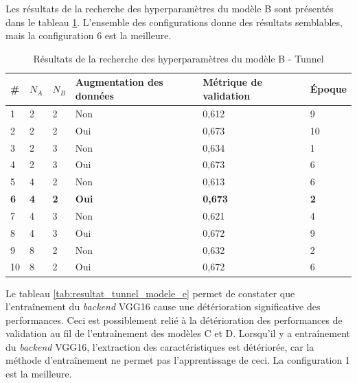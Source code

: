     Les résultats de la recherche des hyperparamètres du modèle B sont présentés dans le tableau \ref{tab:resultat_tunnel_modele_b}. L'ensemble des configurations donne des résultats semblables, mais la configuration 6 est la meilleure.
    \bigskip

    \begin{table}
        \centering
        \caption{Résultats de la recherche des hyperparamètres du modèle B - Tunnel}
        \label{tab:resultat_tunnel_modele_b}
        \begin{tabular}{lllp{3cm}p{3cm}l}
            \midrule
            \# & \(N_A\) & \(N_B\) & Augmentation des données & Métrique de validation & Époque\\
            \midrule\midrule
            1  & 2 & 2 & Non & 0,612 & 9\\
            2  & 2 & 2 & Oui & 0,673 & 10\\
            3  & 2 & 3 & Non & 0,634 & 1\\
            4  & 2 & 3 & Oui & 0,673 & 6\\
            5  & 4 & 2 & Non & 0,613 & 6\\
            \textbf{6}  & \textbf{4} & \textbf{2} & \textbf{Oui} & \textbf{0,673} & \textbf{2}\\
            7  & 4 & 3 & Non & 0,621 & 4\\
            8  & 4 & 3 & Oui & 0,672 & 9\\
            9  & 8 & 2 & Non & 0,632 & 2\\
            10 & 8 & 2 & Oui & 0,672 & 6\\
            \midrule
        \end{tabular}
    \end{table}

    Le tableau \ref{tab:resultat_tunnel_modele_e} permet de constater que l'entraînement du \textit{backend} VGG16 cause une détérioration significative des performances. Ceci est possiblement relié à la détérioration des performances de validation au fil de l'entraînement des modèles C et D. Lorsqu'il y a entraînement du \textit{backend} VGG16, l'extraction des caractéristiques est détériorée, car la méthode d'entraînement ne permet pas l'apprentissage de ceci. La configuration 1 est la meilleure.
    \bigskip

